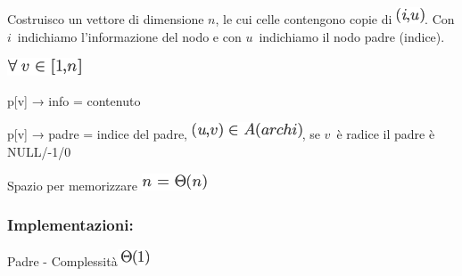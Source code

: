 \documentclass{article}
\begin{document}
{Costruisco un vettore di dimensione
}$n${, le cui celle contengono copie di
}\includegraphics{images/image101.png}{. Con
}$i${~indichiamo l'informazione del
nodo e con }$u${~indichiamo il nodo
padre (indice).}

{}

\includegraphics{images/image104.png}

{p{[}v{]} → info = contenuto}

{p{[}v{]} → padre = indice del padre,
}\includegraphics{images/image105.png}{, se
}$v${~è radice il padre è NULL/-1/0}

{}

{Spazio per memorizzare }\includegraphics{images/image106.png}

{}

\hypertarget{h.ncrwkhkrovb2}{\subsubsection{\texorpdfstring{{Implementazioni:}}{Implementazioni:}}\label{h.ncrwkhkrovb2}}

{Padre - }{Complessità}\includegraphics{images/image107.png}

\protect\hypertarget{t.13d3d44b5647536d159823e4ed75c88728308b7e}{}{}\protect\hypertarget{t.5}{}{}
\end{document}
